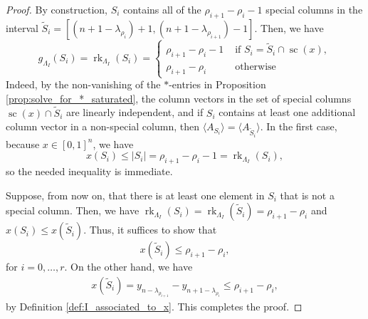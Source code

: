 \documentclass[10pt,a4paper]{amsart}
\DeclareMathOperator{\SC}{sc}
\DeclareMathOperator{\rk}{rk}
\begin{document}
\begin{proof}
By construction, $S_i$ contains all of the $\rho_{i+1}-\rho_i-1$ special columns in the interval $\widetilde{S}_i=[(n+1-\lambda_{\rho_{i}})+1, (n+1-\lambda_{\rho_{i+1}})-1]$. Then, we have
\begin{equation*}
    g_{\Lambda_I}(S_i) = \rk_{\Lambda_I} (S_i) = 
    \begin{cases}
        \rho_{i+1}-\rho_i-1 &\text{ if } S_i = \widetilde{S}_i\cap \SC(x),\\
        \rho_{i+1}-\rho_i&\text{ otherwise}
    \end{cases}
\end{equation*}
Indeed, by the non-vanishing of the $*$-entries in Proposition \ref{prop:solve_for_*_saturated}, the column vectors in the set of special columns $\SC(x)\cap  \widetilde{S}_i$ are linearly independent, and if $S_i$ contains at least one additional column vector in a non-special column, then $\langle A_{S_i}\rangle=\langle A_{\widetilde{S}_i}\rangle$. In the first case, because $x\in[0,1]^n$, we have
\begin{equation*}
    x(S_i)\le |S_i|= \rho_{i+1}-\rho_i-1=\rk_{\Lambda_I} (S_i),
\end{equation*}
so the needed inequality is immediate.

Suppose, from now on, that there is at least one element in $S_i$ that is not a special column. Then, we have $\rk_{\Lambda_I}(S_i) = \rk_{\Lambda_I}(\widetilde{S}_i) = \rho_{i+1}-\rho_i$ and $x(S_i) \le x(\widetilde{S}_i)$. Thus, it suffices to show that 
\begin{equation*}
    x(\widetilde{S}_i) \le \rho_{i+1}-\rho_i,
\end{equation*}
for $i=0,\ldots,r$. On the other hand, we have
\begin{align*}
    x(\widetilde{S}_i)=y_{n-\lambda_{\rho_{i+1}}}-y_{n+1-\lambda_{\rho_i}}\le \rho_{i+1}-\rho_i,
\end{align*}
by Definition \ref{def:I_associated_to_x}. This completes the proof.
\end{proof}
\end{document}
